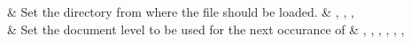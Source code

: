           & Set the directory from where the file should be loaded.
                            & , , , 
                            \\

    \midrule
         & Set the document level to be used for the next occurance of \cmd{\skbheading}
                            & , , , ,
                              , , 
                            \\
